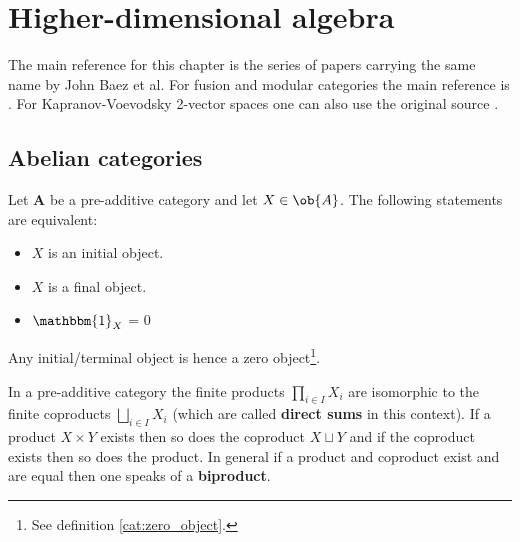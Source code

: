 \chapter{Higher-dimensional algebra}

	The main reference for this chapter is the series of papers carrying the same name by John Baez et al. For fusion and modular categories the main reference is \cite{etingof}. For Kapranov-Voevodsky 2-vector spaces one can also use the original source \cite{kapranov_voevodsky}.

\section{Abelian categories}

	
	\begin{property}
		Let \textbf{A} be a pre-additive category and let $X\in\ob{A}$. The following statements are equivalent:
		\begin{itemize}
			\item $X$ is an initial object.
			\item $X$ is a final object.
			\item $\mathbbm{1}_X$ = 0
		\end{itemize}
		Any initial/terminal object is hence a zero object\footnote{See definition \ref{cat:zero_object}.}.
	\end{property}
	\begin{property}
		In a pre-additive category the finite products $\prod_{i\in I}X_i$ are isomorphic to the finite coproducts $\bigsqcup_{i\in I} X_i$ (which are called \textbf{direct sums} in this context). If a product $X\times Y$ exists then so does the coproduct $X\sqcup Y$ and if the coproduct exists then so does the product. In general if a product and coproduct exist and are equal then one speaks of a \textbf{biproduct}.
	\end{property}
	
	
